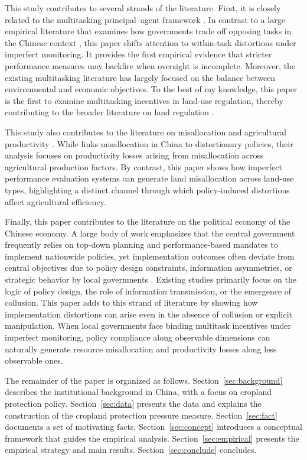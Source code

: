This study contributes to several strands of the literature. First, it is closely related to the multitasking principal–agent framework \citep{holmstrom1991multitask, baker1992incentive}. In contrast to a large empirical literature that examines how governments trade off opposing tasks in the Chinese context \citep{hong2025order, fan2025land, chen2018career, he2020watering}, this paper shifts attention to within-task distortions under imperfect monitoring. It provides the first empirical evidence that stricter performance measures may backfire when oversight is incomplete. Moreover, the existing multitasking literature has largely focused on the balance between environmental and economic objectives. To the best of my knowledge, this paper is the first to examine multitasking incentives in land-use regulation, thereby contributing to the broader literature on land regulation \citep{cai2017build, hilber2016impact, besley2000land}.

This study also contributes to the literature on misallocation and agricultural productivity \citep{adamopoulos2022misallocation, restuccia2017land, lagakos2013selection}. While \cite{adamopoulos2022misallocation} links misallocation in China to distortionary policies, their analysis focuses on productivity losses arising from misallocation across agricultural production factors. By contrast, this paper shows how imperfect performance evaluation systems can generate land misallocation across land-use types, highlighting a distinct channel through which policy-induced distortions affect agricultural efficiency.

Finally, this paper contributes to the literature on the political economy of the Chinese economy. A large body of work emphasizes that the central government frequently relies on top-down planning and performance-based mandates to implement nationwide policies, yet implementation outcomes often deviate from central objectives due to policy design constraints, information asymmetries, or strategic behavior by local governments \citep{wang2025policy, FismanWangYe2025_StrategicCaptureOfMonitors, axbard2024informed, henderson2022political}. Existing studies primarily focus on the logic of policy design, the role of information transmission, or the emergence of collusion. This paper adds to this strand of literature by showing how implementation distortions can arise even in the absence of collusion or explicit manipulation. When local governments face binding multitask incentives under imperfect monitoring, policy compliance along observable dimensions can naturally generate resource misallocation and productivity losses along less observable ones.

The remainder of the paper is organized as follows. Section~\ref{sec:background} describes the institutional background in China, with a focus on cropland protection policy. Section~\ref{sec:data} presents the data and explains the construction of the cropland protection pressure measure. Section~\ref{sec:fact} documents a set of motivating facts. Section~\ref{sec:concept} introduces a conceptual framework that guides the empirical analysis. Section~\ref{sec:empirical} presents the empirical strategy and main results. Section~\ref{sec:conclude} concludes.
